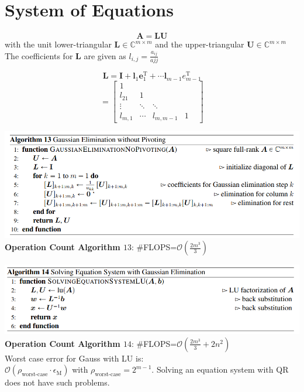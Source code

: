 \documentclass[english]{latex4ei/latex4ei_sheet}
\begin{document}
\section{System of Equations}
\begin{sectionbox}
    $$\mathbf{A} = \mathbf{L}\mathbf{U}$$
    with the unit lower-triangular $\mathbf{L} \in\mathbb{C}^{m\times m}$ and the upper-triangular $\mathbf{U}\in\mathbb{C}^{m\times m}$
    The coefficients for $\mathbf{L}$ are given as  $l_{i,j} = \frac{a_{ij}}{ajj}$

    $$\mathbf{L} = \mathbf{I}+\mathbf{l}_1\mathbf{e}^\text{T}_1+\cdots\mathbf{l}_{m-1}e^\text{T}_{m-1}$$
    $$=\begin{bmatrix}
            1       &        &           &   & \\
            l_{21}  & 1      &           &   & \\
            \vdots  & \ddots & \ddots    &   & \\
            l_{m,1} & \cdots & l_{m,m-1} & 1
        \end{bmatrix}$$

\end{sectionbox}
\begin{sectionbox}
    \includegraphics[width=\textwidth]{img/algo13_gauss_without_pivo.png}
    \textbf{Operation Count Algorithm $13$}: \#FLOPS=$\mathcal{O}(\frac{2m^3}{3})$

\end{sectionbox}
\begin{sectionbox}
    \includegraphics[width=\textwidth]{img/algo14_solve_with_gauss.png}
    \textbf{Operation Count Algorithm $14$}: \#FLOPS=$\mathcal{O}(\frac{2m^3}{3} + 2n^2)$\\
    Worst case error for Gauss with LU is:\\
    $\mathcal{O}(\rho_{\text{worst-case}} \cdot \epsilon_\text{M})$ with $\rho_{\text{worst-case}} = 2^{m-1}$. Solving an equation system with QR does not have such problems.
\end{sectionbox}
\end{document}

